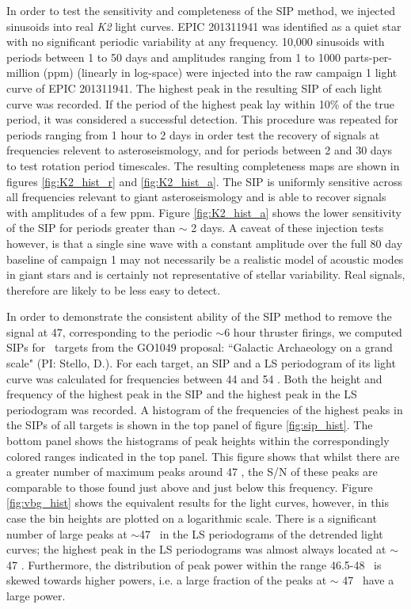 \documentclass[useAMS, usenatbib, preprint, 12pt]{aastex}
\begin{document}
In order to test the sensitivity and completeness of the SIP method,
we injected sinusoids into real {\it K2} light curves.
EPIC 201311941 was identified as a quiet star with no significant periodic
variability at any frequency.
10,000 sinusoids with periods between 1 to 50 days and amplitudes ranging from
1 to 1000 parts-per-million (ppm) (linearly in log-space) were injected into
the raw campaign 1 light curve of EPIC 201311941.
The highest peak in the resulting SIP of each light curve was recorded.
If the period of the highest peak lay within 10\% of the true period, it was
considered a successful detection.
This procedure was repeated for periods ranging from 1 hour to 2 days in order
test the recovery of signals at frequencies relevent to asteroseismology,
and for periods between 2 and 30 days to test rotation period timescales.
The resulting completeness maps are shown in figures \ref{fig:K2_hist_r} and
\ref{fig:K2_hist_a}.
The SIP is uniformly sensitive across all frequencies relevant to giant
asteroseismology and is able to recover signals with amplitudes of a few ppm.
Figure \ref{fig:K2_hist_a} shows the lower sensitivity of the SIP for periods
greater than $\sim$ 2 days.
A caveat of these injection tests however, is that a single sine wave with
a constant amplitude over the full 80 day baseline of campaign 1 may not
necessarily be a realistic model of acoustic modes in giant stars and is
certainly not representative of stellar variability.
Real signals, therefore are likely to be less easy to detect.

In order to demonstrate the consistent ability of the SIP method
to remove the signal at 47\uHz, corresponding to the periodic $\sim$6 hour
thruster firings, we computed SIPs for \nGO\ targets from the GO1049
proposal: ``Galactic Archaeology on a grand scale" (PI: Stello, D.).
For each target, an SIP and a LS periodogram of its
\citet{Vanderburg2014} light curve was calculated for frequencies between
44 and 54 \uHz.
Both the height and frequency of the highest peak in the SIP and the highest
peak in the LS periodogram was recorded.
A histogram of the frequencies of the highest peaks in the SIPs of all \nGO
targets is shown in the top panel of figure \ref{fig:sip_hist}.
The bottom panel shows the histograms of peak heights within the
correspondingly colored ranges indicated in the top panel.
This figure shows that whilst there are a greater number of maximum peaks
around 47 \uHz, the S/N of these peaks are comparable to those found just
above and just below this frequency.
Figure \ref{fig:vbg_hist} shows the equivalent results for the
\citet{Vanderburg2014} light curves, however, in this case the bin heights are
plotted on a logarithmic scale.
There is a significant number of large peaks at $\sim$47 \uHz\ in the LS
periodograms of the detrended light curves; the highest peak in the LS
periodograms was almost always located at $\sim$ 47 \uHz.
Furthermore, the distribution of peak power within the range 46.5-48 \uHz\ is
skewed towards higher powers, i.e. a large fraction of the peaks at $\sim$ 47
\uHz\ have a large power.
\end{document}
